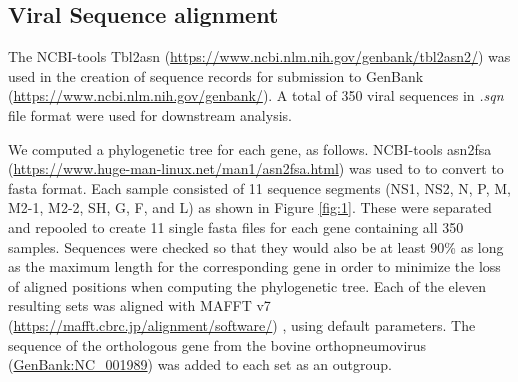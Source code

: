 \documentclass{article} %
\begin{document}
\subsection{Viral Sequence alignment}
The NCBI-tools Tbl2asn (\url{https://www.ncbi.nlm.nih.gov/genbank/tbl2asn2/})
was used in the creation of sequence records for submission to GenBank (\url{https://www.ncbi.nlm.nih.gov/genbank/}).
A total of 350 viral sequences in \textit{.sqn} file format were used for downstream analysis.

We computed a phylogenetic tree for each gene, as follows.
NCBI-tools asn2fsa (\url{https://www.huge-man-linux.net/man1/asn2fsa.html}) was used to to convert to fasta format.
Each sample consisted of 11 sequence segments
(NS1, NS2, N, P, M, M2-1, M2-2, SH, G, F, and L) as shown in 
Figure \ref{fig:1}.
These were separated and repooled to create 11 single fasta files for each gene containing all 350 samples. 
Sequences were checked so that they would also be at least 90\% as long as the maximum length 
for the corresponding gene in order to minimize the loss of aligned positions when computing the phylogenetic tree. 
Each of the eleven resulting sets was aligned with MAFFT v7 (\url{https://mafft.cbrc.jp/alignment/software/})
\cite{katoh2013mafft},
using default  parameters.
The sequence of the orthologous gene from the bovine orthopneumovirus 
(\href{https://www.ncbi.nlm.nih.gov/nuccore/NC_001989}{GenBank:NC\_001989}) 
was added to each set as an outgroup. 
\end{document}
